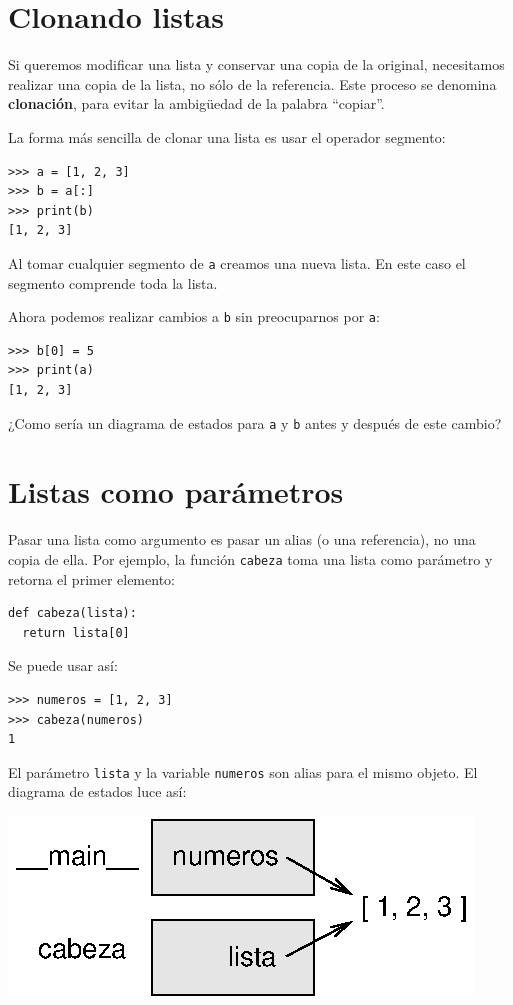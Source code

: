 \section{Clonando listas}

 

Si queremos modificar una lista y conservar una copia de la original,
necesitamos realizar una copia de la lista, no sólo de la referencia.
Este proceso se denomina \textbf{clonación}, para evitar la ambigüedad
de la palabra ``copiar''.

La forma más sencilla de clonar una lista es usar el operador segmento:
\begin{lstlisting}
>>> a = [1, 2, 3]
>>> b = a[:]
>>> print(b)
[1, 2, 3]
\end{lstlisting}
Al tomar cualquier segmento de \texttt{a} creamos una nueva lista.
En este caso el segmento comprende toda la lista.

Ahora podemos realizar cambios a \texttt{b} sin preocuparnos por \texttt{a}:
\begin{lstlisting}
>>> b[0] = 5
>>> print(a)
[1, 2, 3]
\end{lstlisting}
¿Como sería un diagrama de estados para \texttt{a} y \texttt{b} antes
y después de este cambio? 

\section{Listas como parámetros}

  

Pasar una lista como argumento es pasar un alias (o una referencia),
no una copia de ella. Por ejemplo, la función \texttt{cabeza} toma
una lista como parámetro y retorna el primer elemento:
\begin{lstlisting}
def cabeza(lista):
  return lista[0]
\end{lstlisting}
Se puede usar así:
\begin{lstlisting}
>>> numeros = [1, 2, 3]
>>> cabeza(numeros)
1
\end{lstlisting}
El parámetro \texttt{lista} y la variable \texttt{numeros} son alias
para el mismo objeto. El diagrama de estados luce así:

\beforefig \centerline{\includegraphics{illustrations/stack5}}
\afterfig

